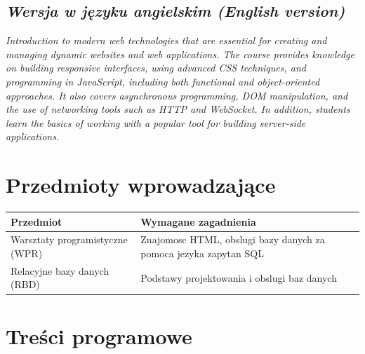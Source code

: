 \documentclass[12pt, a4paper]{article}
\newcommand{\thdrule}{\noalign{\global\setlength{\extrarowheight}{0pt}}}
\newcommand{\thdend}{\noalign{\global\setlength{\extrarowheight}{3pt}}}
\begin{document}
\subsection*{\textit{Wersja w języku angielskim (English version)}}

\textit{Introduction to modern web technologies that are essential for creating and managing dynamic websites and web applications. The course provides knowledge on building responsive interfaces, using advanced CSS techniques, and programming in JavaScript, including both functional and object-oriented approaches. It also covers asynchronous programming, DOM manipulation, and the use of networking tools such as HTTP and WebSocket. In addition, students learn the basics of working with a popular tool for building server-side applications.}


\section{Przedmioty wprowadzające}

{\scriptsize
\begin{tabularx}{\textwidth}{m{5cm}Y}
\thdrule\toprule
{} {\color{white}\textbf{Przedmiot}} & {\color{white}\textbf{Wymagane zagadnienia}} \\
\midrule\thdend
   Warsztaty programistyczne (WPR) & Znajomosc HTML, obslugi bazy danych za pomoca jezyka zapytan SQL \\
   Relacyjne bazy danych (RBD) & Podstawy projektowania i obslugi baz danych \\
\bottomrule
\end{tabularx}}

\section{Treści programowe}
\end{document}
